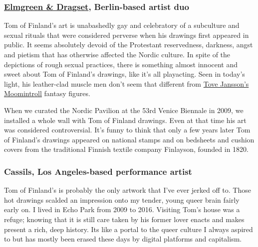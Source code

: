 \hypertarget{elmgreen--dragset-berlin-based-artist-duo}{%
\subsubsection{\texorpdfstring{\textbf{\href{https://tmagazine.blogs.nytimes3xbfgragh.onion/2011/04/22/modern-amusement/}{Elmgreen
\& Dragset}, Berlin-based artist
duo}}{Elmgreen \& Dragset, Berlin-based artist duo}}\label{elmgreen--dragset-berlin-based-artist-duo}}

Tom of Finland's art is unabashedly gay and celebratory of a subculture
and sexual rituals that were considered perverse when his drawings first
appeared in public. It seems absolutely devoid of the Protestant
reservedness, darkness, angst and pietism that has otherwise affected
the Nordic culture. In spite of the depictions of rough sexual
practices, there is something almost innocent and sweet about Tom of
Finland's drawings, like it's all playacting. Seen in today's light, his
leather-clad muscle men don't seem that different from
\href{https://www.nytimes3xbfgragh.onion/2016/12/15/t-magazine/art/moomin-tove-jansson-adventures-moominland.html}{Tove
Jansson's Moomintroll} fantasy figures.

When we curated the Nordic Pavilion at the 53rd Venice Biennale in 2009,
we installed a whole wall with Tom of Finland drawings. Even at that
time his art was considered controversial. It's funny to think that only
a few years later Tom of Finland's drawings appeared on national stamps
and on bedsheets and cushion covers from the traditional Finnish textile
company Finlayson, founded in 1820.

\hypertarget{cassils-los-angeles-based-performance-artist}{%
\subsubsection{\texorpdfstring{\textbf{Cassils, Los Angeles-based
performance
artist}}{Cassils, Los Angeles-based performance artist}}\label{cassils-los-angeles-based-performance-artist}}

Tom of Finland's is probably the only artwork that I've ever jerked off
to. Those hot drawings scalded an impression onto my tender, young queer
brain fairly early on. I lived in Echo Park from 2009 to 2016. Visiting
Tom's house was a refuge; knowing that it is still care taken by his
former lover enacts and makes present a rich, deep history. Its like a
portal to the queer culture I always aspired to but has mostly been
erased these days by digital platforms and capitalism.

